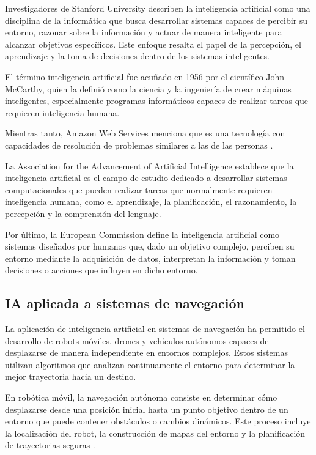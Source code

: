 Investigadores de Stanford University describen la inteligencia artificial como una disciplina de la informática que busca desarrollar sistemas capaces de percibir su entorno, razonar sobre la información y actuar de manera inteligente para alcanzar objetivos específicos. Este enfoque resalta el papel de la percepción, el aprendizaje y la toma de decisiones dentro de los sistemas inteligentes.\cite{stone2016ai100}

El término inteligencia artificial fue acuñado en 1956 por el científico John McCarthy, quien la definió como la ciencia y la ingeniería de crear máquinas inteligentes, especialmente programas informáticos capaces de realizar tareas que requieren inteligencia humana.\cite{mccarthy1955dartmouth}

Mientras tanto, Amazon Web Services menciona que es una tecnología con capacidades de resolución de problemas similares a las de las personas \cite{aws2025_que_es_ia}.

La Association for the Advancement of Artificial Intelligence establece que la inteligencia artificial es el campo de estudio dedicado a desarrollar sistemas computacionales que pueden realizar tareas que normalmente requieren inteligencia humana, como el aprendizaje, la planificación, el razonamiento, la percepción y la comprensión del lenguaje.\cite{aaai2024about}

Por último, la European Commission define la inteligencia artificial como sistemas diseñados por humanos que, dado un objetivo complejo, perciben su entorno mediante la adquisición de datos, interpretan la información y toman decisiones o acciones que influyen en dicho entorno.\cite{ec_hleg2019definition}

\subsection{IA aplicada a sistemas de navegación}

La aplicación de inteligencia artificial en sistemas de navegación ha permitido el desarrollo de robots móviles, drones y vehículos autónomos capaces de desplazarse de manera independiente en entornos complejos. Estos sistemas utilizan algoritmos que analizan continuamente el entorno para determinar la mejor trayectoria hacia un destino.

En robótica móvil, la navegación autónoma consiste en determinar cómo desplazarse desde una posición inicial hasta un punto objetivo dentro de un entorno que puede contener obstáculos o cambios dinámicos. Este proceso incluye la localización del robot, la construcción de mapas del entorno y la planificación de trayectorias seguras \cite{thrun2005probabilistic}.

